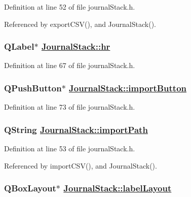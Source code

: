Definition at line 52 of file journal\-Stack.h.

Referenced by export\-CSV(), and Journal\-Stack().\hypertarget{classJournalStack_r14}{
\subsubsection[hr]{\setlength{\rightskip}{0pt plus 5cm}QLabel$\ast$ \hyperlink{classJournalStack_r14}{Journal\-Stack::hr}}}
\label{classJournalStack_r14}


Definition at line 67 of file journal\-Stack.h.\hypertarget{classJournalStack_r20}{
\subsubsection[importButton]{\setlength{\rightskip}{0pt plus 5cm}QPush\-Button$\ast$ \hyperlink{classJournalStack_r20}{Journal\-Stack::import\-Button}}}
\label{classJournalStack_r20}


Definition at line 73 of file journal\-Stack.h.\hypertarget{classJournalStack_r4}{
\subsubsection[importPath]{\setlength{\rightskip}{0pt plus 5cm}QString \hyperlink{classJournalStack_r4}{Journal\-Stack::import\-Path}}}
\label{classJournalStack_r4}


Definition at line 53 of file journal\-Stack.h.

Referenced by import\-CSV(), and Journal\-Stack().\hypertarget{classJournalStack_r8}{
\subsubsection[labelLayout]{\setlength{\rightskip}{0pt plus 5cm}QBox\-Layout$\ast$ \hyperlink{classJournalStack_r8}{Journal\-Stack::label\-Layout}}}
\label{classJournalStack_r8}


